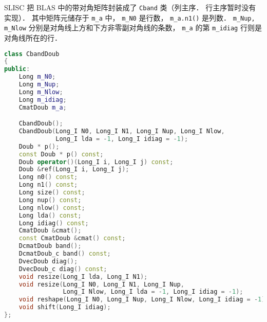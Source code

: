 
\begin{issues}
\issueDraft
\end{issues}


SLISC 把 BLAS 中的带对角矩阵封装成了 \verb|Cband| 类（列主序． 行主序暂时没有实现）． 其中矩阵元储存于 \verb|m_a| 中， \verb|m_N0| 是行数， \verb|m_a.n1()| 是列数． \verb|m_Nup, m_Nlow| 分别是对角线上方和下方非零副对角线的条数， \verb|m_a| 的第 \verb|m_idiag| 行则是对角线所在的行．
\begin{lstlisting}[language=cpp]
class CbandDoub
{
public:
    Long m_N0;
    Long m_Nup;
    Long m_Nlow;
    Long m_idiag;
    CmatDoub m_a;

    CbandDoub();
    CbandDoub(Long_I N0, Long_I N1, Long_I Nup, Long_I Nlow,
              Long_I lda = -1, Long_I idiag = -1);
    Doub * p();
    const Doub * p() const;
    Doub operator()(Long_I i, Long_I j) const;
    Doub &ref(Long_I i, Long_I j);
    Long n0() const;
    Long n1() const;
    Long size() const;
    Long nup() const;
    Long nlow() const;
    Long lda() const;
    Long idiag() const;
    CmatDoub &cmat();
    const CmatDoub &cmat() const;
    DcmatDoub band();
    DcmatDoub_c band() const;
    DvecDoub diag();
    DvecDoub_c diag() const;
    void resize(Long_I lda, Long_I N1);
    void resize(Long_I N0, Long_I N1, Long_I Nup,
                Long_I Nlow, Long_I lda = -1, Long_I idiag = -1);
    void reshape(Long_I N0, Long_I Nup, Long_I Nlow, Long_I idiag = -1);
    void shift(Long_I idiag);
};
\end{lstlisting}
